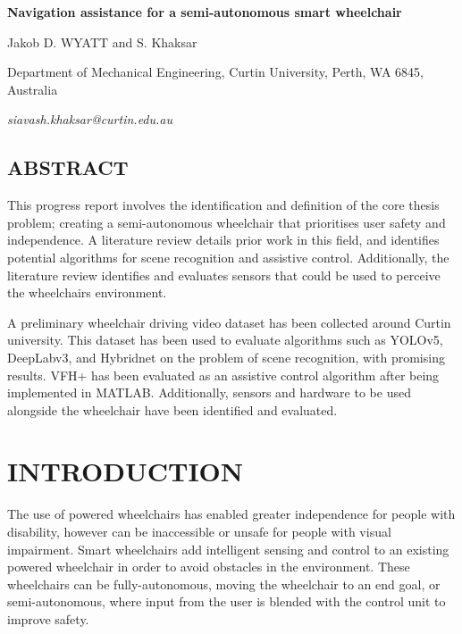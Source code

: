 \documentclass[10pt,twoside]{article}
\begin{document}
\begin{center}
\fontsize{12}{14.4}\selectfont
\textbf{Navigation assistance for a semi-autonomous smart wheelchair}
\fontsize{11}{13.2}\selectfont

\vspace{11pt}

Jakob D. WYATT and S. Khaksar

\vspace{11pt}

Department of Mechanical Engineering, Curtin University, Perth, WA 6845, Australia

\vspace{11pt}

\end{center}
\begin{flushright}
\textit{siavash.khaksar@curtin.edu.au}
\end{flushright}

\begin{adjustwidth}{10mm}{10mm}
\section*{\textbf{ABSTRACT}}
This progress report involves the identification and definition of the core thesis problem;
creating a semi-autonomous wheelchair that prioritises user safety and independence.
A literature review details prior work in this field, and identifies potential algorithms
for scene recognition and assistive control. Additionally, the literature review identifies and evaluates
sensors that could be used to perceive the wheelchairs environment.

A preliminary wheelchair driving video dataset has been collected around Curtin university.
This dataset has been used to evaluate algorithms such as YOLOv5, DeepLabv3, and Hybridnet on
the problem of scene recognition, with promising results. VFH+ has been evaluated as an assistive
control algorithm after being implemented in MATLAB. Additionally, sensors and hardware to be used
alongside the wheelchair have been identified and evaluated.
\end{adjustwidth}

\section*{\textbf{INTRODUCTION}}
The use of powered wheelchairs has enabled greater independence for people with disability,
however can be inaccessible or unsafe for people with visual impairment.
Smart wheelchairs add intelligent sensing and control to an existing powered wheelchair
in order to avoid obstacles in the environment. These wheelchairs can be fully-autonomous, moving the wheelchair
to an end goal, or semi-autonomous, where input from the user is blended with the control unit to improve safety.
\end{document}

